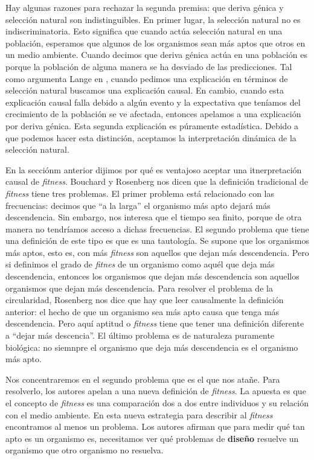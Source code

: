 Hay algunas razones para rechazar la segunda premisa: que deriva génica y selección natural son indistinguibles. En primer lugar, la selección natural no es indiscriminatoria. Esto significa que cuando actúa selección natural en una población, esperamos que algunos de los organismos sean más aptos que otros en un medio ambiente. Cuando decimos que deriva génica actúa en una población es porque la población de alguna manera se ha desviado de las predicciones. Tal como argumenta Lange en \citeyear{Lange2013}, cuando pedimos una explicación en términos de selección natural buscamos una explicación causal. En cambio, cuando esta explicación causal falla debido a algún evento y la expectativa que teníamos del crecimiento de la población se ve afectada, entonces apelamos a una explicación por deriva génica. Esta segunda explicación es púramente estadística. Debido a que podemos hacer esta distinción, aceptamos la interpretación dinámica de la selección natural.

En la secciónm anterior dijimos por qué es ventajoso aceptar una itnerpretación causal de \emph{fitness}. Bouchard y Rosenberg \cite{Bouchard2004} nos dicen que la definición tradicional de \emph{fitness} tiene tres problemas. El primer problema está relacionado con las frecuencias: decimos que ``a la larga'' el organismo más apto dejará más descendencia. Sin embargo, nos interesa que el tiempo sea finito, porque de otra manera no tendríamos acceso a dichas frecuencias. El segundo problema que tiene una definición de este tipo es que es una tautología. Se supone que los organismos más aptos, esto es, con más \emph{fitness} son aquellos que dejan más descendencia. Pero si definimos el grado de \emph{fitnes} de un organismo como aquél que deja más descendencia, entonces los organismos que dejan más descendencia son aquellos organismos que dejan más descendencia. Para resolver el problema de la circularidad, Rosenberg nos dice que hay que leer causalmente la definición anterior: el hecho de que un organismo sea más apto causa que tenga más descendencia. Pero aquí aptitud o \emph{fitness} tiene que tener una definición diferente a ``dejar más descencia''. El último problema es de naturaleza puramente biológica: no siemnpre el organismo que deja más descendencia es el organismo más apto.

Nos concentraremos en el segundo problema que es el que nos atañe. Para resolverlo, los autores apelan a una nueva definición de \emph{fitness}. La apuesta es que el concepto de \emph{fitness} es una comparación dos a dos entre individuos y su relación con el medio ambiente. En esta nueva estrategia para describir al \emph{fitness} encontramos al menos un problema. Los autores afirman que para medir qué tan apto es un organismo es, necesitamos ver qué problemas de \textbf{diseño} resuelve un organismo que otro organismo no resuelva.

